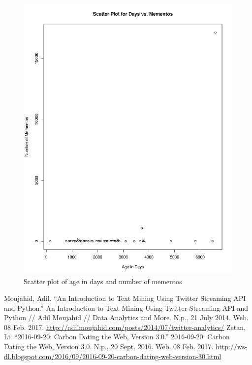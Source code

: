 \documentclass[letterpaper,11pt]{article}
\begin{document}
\begin{figure}[h]
\centering
\includegraphics[scale=0.6]{carbonDateScatterplot.pdf}
\caption{Scatter plot of age in days and number of mementos}
\label{fig:scatterplot}
\end{figure}

\clearpage


\clearpage


\begin{thebibliography}{9}
Moujahid, Adil. ``An Introduction to Text Mining Using Twitter Streaming API and Python.'' An Introduction to Text Mining Using Twitter Streaming API and Python // Adil Moujahid // Data Analytics and More. N.p., 21 July 2014. Web. 08 Feb. 2017. \url{http://adilmoujahid.com/posts/2014/07/twitter-analytics/}
Zetan, Li. ``2016-09-20: Carbon Dating the Web, Version 3.0.'' 2016-09-20: Carbon Dating the Web, Version 3.0. N.p., 20 Sept. 2016. Web. 08 Feb. 2017. \url{http://ws-dl.blogspot.com/2016/09/2016-09-20-carbon-dating-web-version-30.html}
\end{thebibliography}
\end{document}
